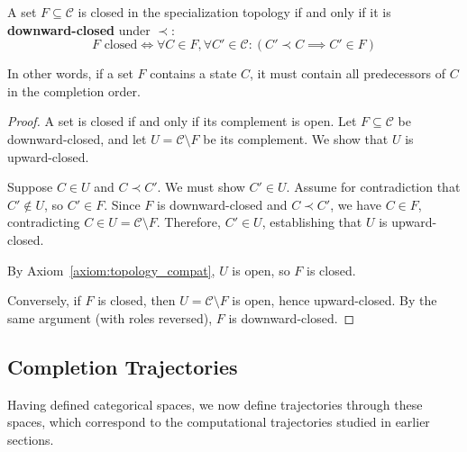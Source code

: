 \begin{proposition}
\label{prop:closed_sets_formal}
A set $F \subseteq \mathcal{C}$ is closed in the specialization topology if and only if it is \textbf{downward-closed} under $\prec$:
\begin{equation}
F \text{ closed} \iff \forall C \in F, \forall C' \in \mathcal{C}: (C' \prec C \implies C' \in F)
\label{eq:closed_sets}
\end{equation}

In other words, if a set $F$ contains a state $C$, it must contain all predecessors of $C$ in the completion order.
\end{proposition}

\begin{proof}
A set is closed if and only if its complement is open. Let $F \subseteq \mathcal{C}$ be downward-closed, and let $U = \mathcal{C} \setminus F$ be its complement. We show that $U$ is upward-closed.

Suppose $C \in U$ and $C \prec C'$. We must show $C' \in U$. Assume for contradiction that $C' \notin U$, so $C' \in F$. Since $F$ is downward-closed and $C \prec C'$, we have $C \in F$, contradicting $C \in U = \mathcal{C} \setminus F$. Therefore, $C' \in U$, establishing that $U$ is upward-closed.

By Axiom~\ref{axiom:topology_compat}, $U$ is open, so $F$ is closed.

Conversely, if $F$ is closed, then $U = \mathcal{C} \setminus F$ is open, hence upward-closed. By the same argument (with roles reversed), $F$ is downward-closed.
\end{proof}

\subsection{Completion Trajectories}

Having defined categorical spaces, we now define trajectories through these spaces, which correspond to the computational trajectories studied in earlier sections.

